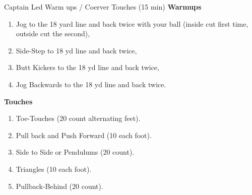 \begin{agendablock}{Captain Led Warm ups / Coerver Touches (15 min) }
    \textbf{Warmups}
    \begin{enumerate}
        \item Jog to the 18 yard line and back twice with your ball (inside cut first time, outside cut the second),
        \item Side-Step to 18 yd line and back twice,
        \item Butt Kickers to the 18 yd line and back twice,
        \item Jog Backwards to the 18 yd line and back twice.
    \end{enumerate}
    \textbf{Touches}
    \begin{enumerate}
        \item Toe-Touches (20 count alternating feet).
        \item Pull back and Push Forward (10 each foot).
        \item Side to Side or Pendulums (20 count).
        \item Triangles (10 each foot).
        \item Pullback-Behind (20 count).
    \end{enumerate}
\end{agendablock}